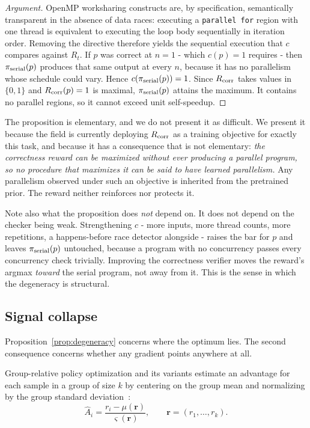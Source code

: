 \begin{proof}[Argument]
OpenMP worksharing constructs are, by specification, semantically transparent
in the absence of data races: executing a \texttt{parallel for} region with one
thread is equivalent to executing the loop body sequentially in iteration
order. Removing the directive therefore yields the sequential execution that
$c$ compares against $R_t$. If $p$ was correct at $n=1$ - which
$c(p)=1$ requires - then $\pi_{\mathrm{serial}}(p)$ produces that same output at every
$n$, because it has no parallelism whose schedule could vary. Hence
$c(\pi_{\mathrm{serial}}(p))=1$. Since $R_{\mathrm{corr}}$ takes values in $\{0,1\}$ and
$R_{\mathrm{corr}}(p)=1$ is maximal, $\pi_{\mathrm{serial}}(p)$ attains the maximum. It contains no
parallel regions, so it cannot exceed unit self-speedup.
\end{proof}

The proposition is elementary, and we do not present it as difficult. We
present it because the field is currently deploying $R_{\mathrm{corr}}$ as a training
objective for exactly this task, and because it has a consequence that is not
elementary: \emph{the correctness reward can be maximized without ever
producing a parallel program, so no procedure that maximizes it can be said to
have learned parallelism.} Any parallelism observed under such an objective is
inherited from the pretrained prior. The reward neither reinforces nor
protects it.

Note also what the proposition does \emph{not} depend on. It does not depend on
the checker being weak. Strengthening $c$ - more inputs, more thread counts,
more repetitions, a happens-before race detector alongside - raises the bar for
$p$ and leaves $\pi_{\mathrm{serial}}(p)$ untouched, because a program with no
concurrency passes every concurrency check trivially. Improving the correctness
verifier moves the reward's argmax \emph{toward} the serial program, not away
from it. This is the sense in which the degeneracy is structural.

\subsection{Signal collapse}

Proposition~\ref{prop:degeneracy} concerns where the optimum lies. The second
consequence concerns whether any gradient points anywhere at all.

Group-relative policy optimization and its variants estimate an advantage for
each sample in a group of size $k$ by centering on the group mean and
normalizing by the group standard
deviation~\cite{grpo,dapo,drgrpo,gspo,threeops}:
\begin{equation}
  \hat{A}_i = \frac{r_i - \mu(\mathbf{r})}{\varsigma(\mathbf{r})}, \qquad
  \mathbf{r} = (r_1,\dots,r_k).
  \label{eq:advantage}
\end{equation}

